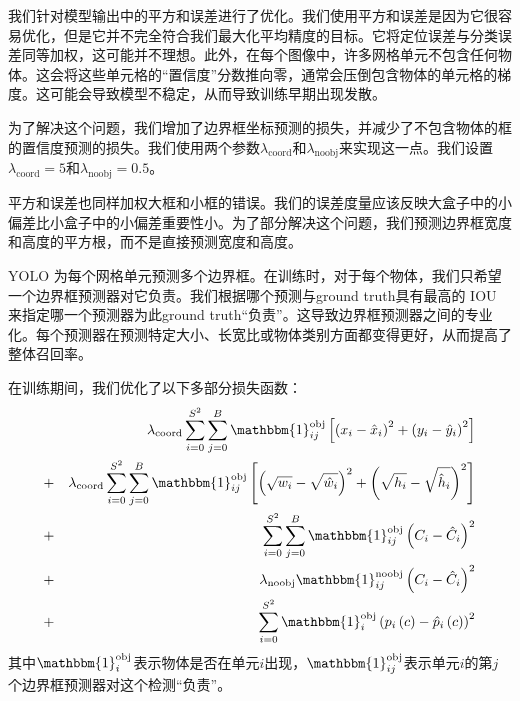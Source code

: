 \documentclass[../main.tex]{subfile}
\begin{document}
我们针对模型输出中的平方和误差进行了优化。我们使用平方和误差是因为它很容易优化，但是它并不完全符合我们最大化平均精度的目标。它将定位误差与分类误差同等加权，这可能并不理想。此外，在每个图像中，许多网格单元不包含任何物体。这会将这些单元格的“置信度”分数推向零，通常会压倒包含物体的单元格的梯度。这可能会导致模型不稳定，从而导致训练早期出现发散。

为了解决这个问题，我们增加了边界框坐标预测的损失，并减少了不包含物体的框的置信度预测的损失。我们使用两个参数$ \lambda_\text{coord} $和$ \lambda_\text{noobj} $来实现这一点。我们设置$ \lambda_\text{coord} = 5 $和$ \lambda_\text{noobj} = 0.5$。

平方和误差也同样加权大框和小框的错误。我们的误差度量应该反映大盒子中的小偏差比小盒子中的小偏差重要性小。为了部分解决这个问题，我们预测边界框宽度和高度的平方根，而不是直接预测宽度和高度。

YOLO 为每个网格单元预测多个边界框。在训练时，对于每个物体，我们只希望一个边界框预测器对它负责。我们根据哪个预测与ground truth具有最高的 IOU 来指定哪一个预测器为此ground truth“负责”。这导致边界框预测器之间的专业化。每个预测器在预测特定大小、长宽比或物体类别方面都变得更好，从而提高了整体召回率。

在训练期间，我们优化了以下多部分损失函数：
\begin{equation}
    \begin{aligned}
         &   & \lambda_\text{coord}\sum_{i=0}^{S^2}\sum_{j=0}^{B}\mathbbm{1}_{ij}^\text{obj}\left[ \left(x_i - \hat{x}_i\right)^2 + \left(y_i - \hat{y}_i\right)^2 \right]                             \\
         & + & \lambda_\text{coord}\sum_{i=0}^{S^2}\sum_{j=0}^{B}\mathbbm{1}_{ij}^\text{obj}\left[ \left(\sqrt{w_i} - \sqrt{\hat{w}_i}\right)^2 + \left(\sqrt{h_i} - \sqrt{\hat{h}_i}\right)^2 \right] \\
         & + & \sum_{i=0}^{S^2}\sum_{j=0}^{B}\mathbbm{1}_{ij}^\text{obj}\left(C_i - \hat{C}_i\right)^2                                                                                                 \\
         & + & \lambda_\text{noobj}\mathbbm{1}_{ij}^\text{noobj}\left(C_i - \hat{C}_i\right)^2                                                                                                         \\
         & + & \sum_{i=0}^{S^2}\mathbbm{1}_i^\text{obj}\left(p_i\left(c\right) - \hat{p}_i\left(c\right)\right)^2
    \end{aligned}
\end{equation}
其中$\mathbbm{1}_i^\text{obj}$表示物体是否在单元$i$出现，$\mathbbm{1}_{ij}^\text{obj}$表示单元$i$的第$j$个边界框预测器对这个检测“负责”。
\end{document}
